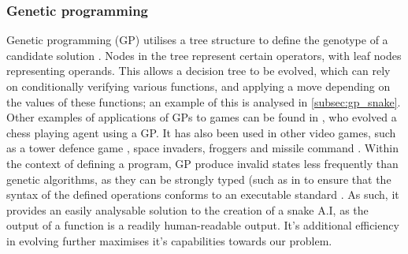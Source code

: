 \documentclass[british,10pt,a4paper]{article}
\begin{document}
\subsubsection{Genetic programming}
\label{subsec:gp}
Genetic programming (GP) utilises a tree structure to define the genotype of a candidate solution \cite{Cramer_undated-bj}. Nodes in the tree represent certain operators, with leaf nodes representing operands. This allows a decision tree to be evolved, which can rely on conditionally verifying various functions, and applying a move depending on the values of these functions; an example of this is analysed in \autoref{subsec:gp_snake}. Other examples of applications of GPs to games can be found in \citet{Hauptman2005-zg}, who evolved a chess playing agent using a GP. It has also been used in other video games, such as a tower defence game \cite{Leong2013-pu}, space invaders, froggers and missile command \cite{Jia2015-jk}. Within the context of defining a program, GP produce invalid states less frequently than genetic algorithms, as they can be strongly typed (such as in \cite{Jia2015-jk} to ensure that the syntax of the defined operations conforms to an executable standard \cite{Chen2012-ei}. As such, it provides an easily analysable solution to the creation of a snake A.I, as the output of a function is a readily human-readable output. It's additional efficiency in evolving further maximises it's capabilities towards our problem.
\end{document}
